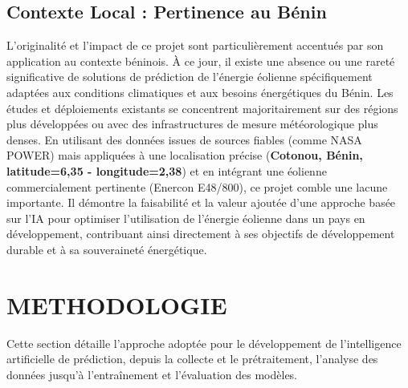 \documentclass[12pt]{article}
\begin{document}
\subsection{Contexte Local : Pertinence au Bénin}
L'originalité et l'impact de ce projet sont particulièrement accentués par son application au contexte béninois. À ce jour, il existe une absence ou une rareté significative de solutions de prédiction de l'énergie éolienne spécifiquement adaptées aux conditions climatiques et aux besoins énergétiques du Bénin. Les études et déploiements existants se concentrent majoritairement sur des régions plus développées ou avec des infrastructures de mesure météorologique plus denses. En utilisant des données issues de sources fiables (comme NASA POWER) mais appliquées à une localisation précise (\textbf{Cotonou, Bénin, latitude=6,35 - longitude=2,38}) et en intégrant une éolienne commercialement pertinente (Enercon E48/800), ce projet comble une lacune importante. Il démontre la faisabilité et la valeur ajoutée d'une approche basée sur l'IA pour optimiser l'utilisation de l'énergie éolienne dans un pays en développement, contribuant ainsi directement à ses objectifs de développement durable et à sa souveraineté énergétique.
\section{METHODOLOGIE}
Cette section détaille l'approche adoptée pour le développement de l'intelligence artificielle de prédiction, depuis la collecte et le prétraitement, l'analyse des données jusqu'à l'entraînement et l'évaluation des modèles.
\end{document}
